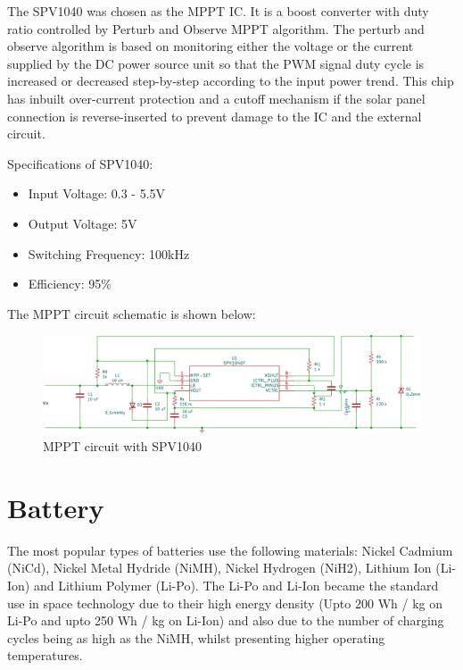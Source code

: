 The SPV1040 was chosen as the MPPT IC. It is a boost converter with duty ratio controlled by Perturb and Observe MPPT algorithm. The perturb and observe algorithm is based on monitoring either the voltage or the current supplied by the DC power source unit so that the PWM signal duty cycle is increased or decreased step-by-step according to the input power trend. This chip has inbuilt over-current protection and a cutoff mechanism if the solar panel connection is reverse-inserted to prevent damage to the IC and the external circuit.

Specifications of  SPV1040:
	\begin{itemize}
	\item Input Voltage: 0.3 - 5.5V
	\item Output Voltage: 5V
	\item Switching Frequency: 100kHz
	\item Efficiency: 95\%
\end{itemize}
The MPPT circuit schematic is shown below:
 	\begin{figure}[ht]
	\centering
	\includegraphics[width=\columnwidth]{mppt.pdf}
	\caption{MPPT circuit with SPV1040}
	\label{fig:mpptsch}
\end{figure}

\section[Battery]{Battery}
The most popular types of batteries use the following materials: Nickel Cadmium
(NiCd), Nickel Metal Hydride (NiMH), Nickel Hydrogen (NiH2), Lithium Ion
(Li-Ion) and Lithium Polymer (Li-Po). The Li-Po and Li-Ion became the standard use in space technology due to their
high energy density (Upto 200 Wh / kg on Li-Po and upto 250 Wh / kg on Li-Ion) and also due to
the number of charging cycles being as high as the NiMH, whilst presenting higher
operating temperatures. 
